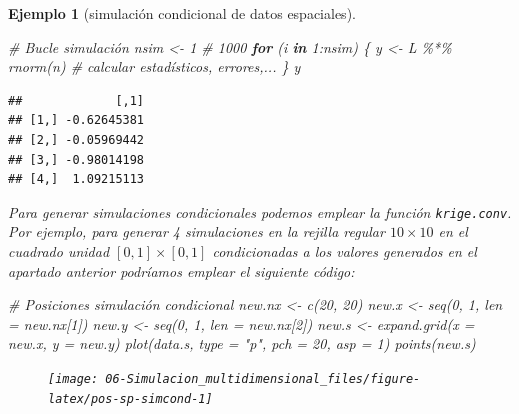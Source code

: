 \documentclass[
]{book}
\newenvironment{Shaded}{\begin{snugshade}}{\end{snugshade}}
\newcommand{\AttributeTok}[1]{\textcolor[rgb]{0.77,0.63,0.00}{#1}}
\newcommand{\CommentTok}[1]{\textcolor[rgb]{0.56,0.35,0.01}{\textit{#1}}}
\newcommand{\ControlFlowTok}[1]{\textcolor[rgb]{0.13,0.29,0.53}{\textbf{#1}}}
\newcommand{\DecValTok}[1]{\textcolor[rgb]{0.00,0.00,0.81}{#1}}
\newcommand{\FunctionTok}[1]{\textcolor[rgb]{0.00,0.00,0.00}{#1}}
\newcommand{\NormalTok}[1]{#1}
\newcommand{\OtherTok}[1]{\textcolor[rgb]{0.56,0.35,0.01}{#1}}
\newcommand{\SpecialCharTok}[1]{\textcolor[rgb]{0.00,0.00,0.00}{#1}}
\newcommand{\StringTok}[1]{\textcolor[rgb]{0.31,0.60,0.02}{#1}}
\theoremstyle{break}
\newtheorem{example}{Ejemplo}[chapter]
\theoremstyle{nonumberplain}
\begin{document}
\begin{example}[simulación condicional de datos espaciales]
\begin{Shaded}
\begin{Highlighting}[]
\CommentTok{\# Bucle simulación}
\NormalTok{nsim }\OtherTok{\textless{}{-}} \DecValTok{1} \CommentTok{\# 1000}
\ControlFlowTok{for}\NormalTok{ (i }\ControlFlowTok{in} \DecValTok{1}\SpecialCharTok{:}\NormalTok{nsim) \{}
\NormalTok{  y }\OtherTok{\textless{}{-}}\NormalTok{ L }\SpecialCharTok{\%*\%} \FunctionTok{rnorm}\NormalTok{(n)}
  \CommentTok{\# calcular estadísticos, errores,...}
\NormalTok{\}}
\NormalTok{y}
\end{Highlighting}
\end{Shaded}

\begin{verbatim}
##             [,1]
## [1,] -0.62645381
## [2,] -0.05969442
## [3,] -0.98014198
## [4,]  1.09215113
\end{verbatim}

Para generar simulaciones condicionales podemos emplear la función \texttt{krige.conv}.
Por ejemplo, para generar 4 simulaciones en la rejilla regular \(10\times10\) en el cuadrado unidad \([0,1] \times [0,1]\) condicionadas a los valores generados en el apartado anterior podríamos emplear el siguiente código:

\begin{Shaded}
\begin{Highlighting}[]
\CommentTok{\# Posiciones simulación condicional}
\NormalTok{new.nx }\OtherTok{\textless{}{-}} \FunctionTok{c}\NormalTok{(}\DecValTok{20}\NormalTok{, }\DecValTok{20}\NormalTok{)}
\NormalTok{new.x }\OtherTok{\textless{}{-}} \FunctionTok{seq}\NormalTok{(}\DecValTok{0}\NormalTok{, }\DecValTok{1}\NormalTok{, }\AttributeTok{len =}\NormalTok{ new.nx[}\DecValTok{1}\NormalTok{])}
\NormalTok{new.y }\OtherTok{\textless{}{-}} \FunctionTok{seq}\NormalTok{(}\DecValTok{0}\NormalTok{, }\DecValTok{1}\NormalTok{, }\AttributeTok{len =}\NormalTok{ new.nx[}\DecValTok{2}\NormalTok{])}
\NormalTok{new.s }\OtherTok{\textless{}{-}} \FunctionTok{expand.grid}\NormalTok{(}\AttributeTok{x =}\NormalTok{ new.x, }\AttributeTok{y =}\NormalTok{ new.y)}
\FunctionTok{plot}\NormalTok{(data.s, }\AttributeTok{type =} \StringTok{"p"}\NormalTok{, }\AttributeTok{pch =} \DecValTok{20}\NormalTok{, }\AttributeTok{asp =} \DecValTok{1}\NormalTok{)}
\FunctionTok{points}\NormalTok{(new.s)}
\end{Highlighting}
\end{Shaded}

\begin{figure}[!htb]

{\centering \texttt{[image: 06-Simulacion\_multidimensional\_files/figure-latex/pos-sp-simcond-1]} 

}
\end{figure}
\end{example}
\end{document}

